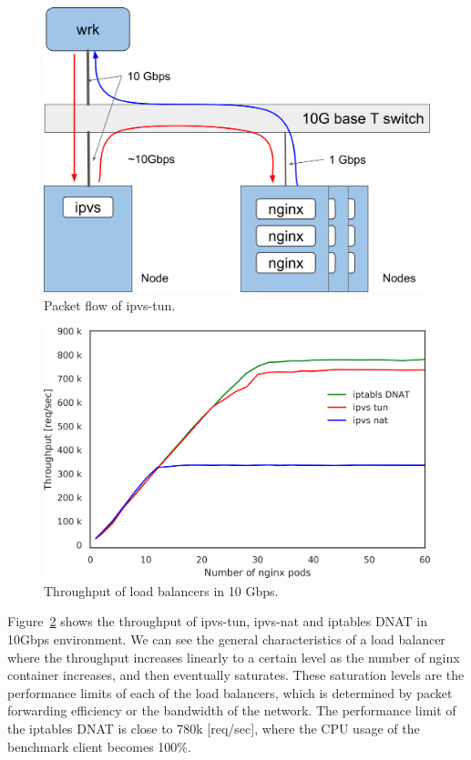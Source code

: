 \begin{figure}[h]
  \centering
  \includegraphics[width=0.8\columnwidth]{Figs/bench_10g_l3dsr}
  \caption{Packet flow of ipvs-tun.}
  \label{fig:bench_10g_l3dsr}
\end{figure}

\begin{figure}[h]
  \centering
  \includegraphics[width=0.8\columnwidth]{Figs/ipvs_l3dsr_10g}
  \caption{Throughput of load balancers in 10 Gbps.}
  \label{fig:ipvs_l3dsr_10g}
\end{figure}

Figure~\ref{fig:ipvs_l3dsr_10g} shows the throughput of ipvs-tun, ipvs-nat and iptables DNAT in 10Gbps environment.
We can see the general characteristics of a load balancer where the throughput increases linearly to a certain level as the number of nginx container increases, and then eventually saturates.
These saturation levels are the performance limits of each of the load balancers, which is determined by packet forwarding efficiency or the bandwidth of the network.
The performance limit of the iptables DNAT is close to 780k [req/sec], where the CPU usage of the benchmark client becomes 100\%.

